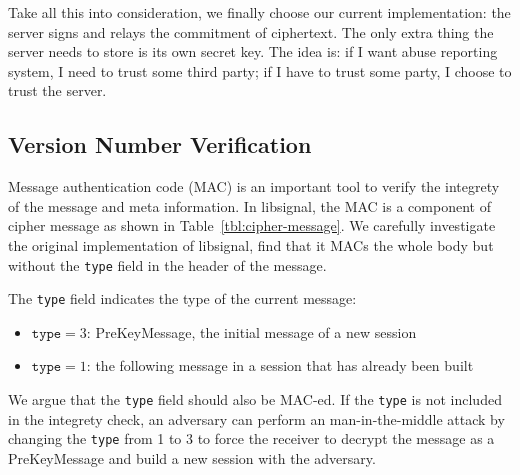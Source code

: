 Take all this into consideration, we finally choose our current implementation:
the server signs and relays the commitment of ciphertext.
The only extra thing the server needs to store is its own secret key.
The idea is: if I want abuse reporting system, I need to trust some third party;
if I have to trust some party, I choose to trust the server.

\subsection{Version Number Verification}
Message authentication code (MAC) is an important tool to verify the integrety of the message and meta information.
In libsignal, the MAC is a component of cipher message as shown in Table~\ref{tbl:cipher-message}.
We carefully investigate the original implementation of libsignal,
find that it MACs the whole body but without the \texttt{type} field in the header of the message.

The \texttt{type} field indicates the type of the current message:
\begin{itemize}
\item $\texttt{type} = 3$: PreKeyMessage, the initial message of a new session
\item $\texttt{type} = 1$: the following message in a session that has already been built 
\end{itemize}
We argue that the \texttt{type} field should also be MAC-ed.
If the \texttt{type} is not included in the integrety check,
an adversary can perform an man-in-the-middle attack by changing the \texttt{type}
from 1 to 3 to force the receiver to decrypt the message as a PreKeyMessage
and build a new session with the adversary.


